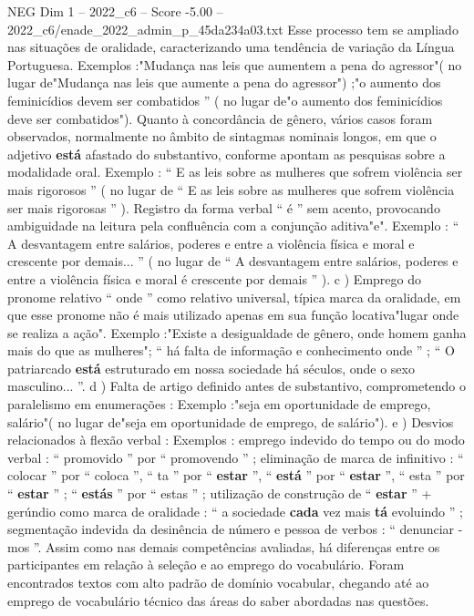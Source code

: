\begin{textsample}{NEG Dim 1 – 2022\_c6 – Score -5.00 – 2022\_c6/enade\_2022\_admin\_p\_45da234a03.txt}
Esse processo tem se ampliado nas situações de oralidade, caracterizando uma tendência de variação da Língua Portuguesa.
Exemplos :"Mudança nas leis que aumentem a pena do agressor"( no lugar de"Mudança nas leis que aumente a pena do agressor") ;"o aumento dos feminicídios devem ser combatidos ” ( no lugar de"o aumento dos feminicídios deve ser combatidos").
Quanto à concordância de gênero, vários casos foram observados, normalmente no âmbito de sintagmas nominais longos, em que o adjetivo \textbf{está} afastado do substantivo, conforme apontam as pesquisas sobre a modalidade oral.
Exemplo : “ E as leis sobre as mulheres que sofrem violência ser mais rigorosos ” ( no lugar de “ E as leis sobre as mulheres que sofrem violência ser mais rigorosas ” ).
Registro da forma verbal “ é ” sem acento, provocando ambiguidade na leitura pela confluência com a conjunção aditiva"e".
Exemplo : “ A desvantagem entre salários, poderes e entre a violência física e moral e crescente por demais... ” ( no lugar de “ A desvantagem entre salários, poderes e entre a violência física e moral é crescente por demais ” ). c ) Emprego do pronome relativo “ onde ” como relativo universal, típica marca da oralidade, em que esse pronome não é mais utilizado apenas em sua função locativa"lugar onde se realiza a ação".
Exemplo :"Existe a desigualdade de gênero, onde homem ganha mais do que as mulheres"; “ há falta de informação e conhecimento onde ” ; “ O patriarcado \textbf{está} estruturado em nossa sociedade há séculos, onde o sexo masculino... ”. d ) Falta de artigo definido antes de substantivo, comprometendo o paralelismo em enumerações : Exemplo :"seja em oportunidade de emprego, salário"( no lugar de"seja em oportunidade de emprego, de salário"). e ) Desvios relacionados à flexão verbal : Exemplos : emprego indevido do tempo ou do modo verbal : “ promovido ” por “ promovendo ” ; eliminação de marca de infinitivo : “ colocar ” por “ coloca ”, “ ta ” por “ \textbf{estar} ”, “ \textbf{está} ” por “ \textbf{estar} ”, “ esta ” por “ \textbf{estar} ” ; “ \textbf{estás} ” por “ estas ” ; utilização de construção de “ \textbf{estar} ” + gerúndio como marca de oralidade : “ a sociedade \textbf{cada} vez mais \textbf{tá} evoluindo ” ; segmentação indevida da desinência de número e pessoa de verbos : “ denunciar -mos ”.
Assim como nas demais competências avaliadas, há diferenças entre os participantes em relação à seleção e ao emprego do vocabulário.
Foram encontrados textos com alto padrão de domínio vocabular, chegando até ao emprego de vocabulário técnico das áreas do saber abordadas nas questões.

\end{textsample}
